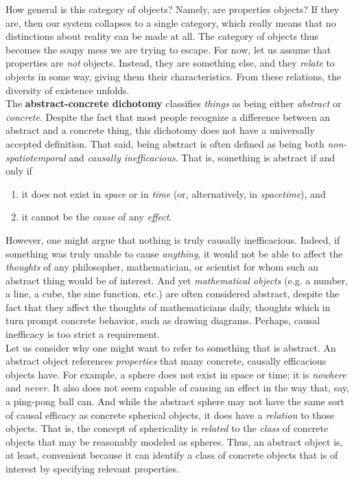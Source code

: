 How general is this category of objects? Namely, are properties objects? If they are, then our system collapses to a single category, which really means that no distinctions about reality can be made at all. The category of objects thus becomes the soupy mess we are trying to escape. For now, let us assume that properties are \textit{not} objects. Instead, they are something else, and they \textit{relate} to objects in some way, giving them their characteristics. From these relations, the diversity of existence unfolds. \\


The \textbf{abstract-concrete dichotomy} classifies \textit{things} as being either \textit{abstract} or \textit{concrete}. Despite the fact that most people recognize a difference between an abstract and a concrete thing, this dichotomy does not have a universally accepted definition. That said, being abstract is often defined as being both \textit{non-spatiotemporal} and \textit{causally inefficacious}. That is, something is abstract if and only if 

\begin{enumerate}
	\item it does not exist in \textit{space} or in \textit{time} (or, alternatively, in \textit{spacetime}), and
	\item it cannot be the \textit{cause} of any \textit{effect}. \\
\end{enumerate}

However, one might argue that nothing is truly causally inefficacious. Indeed, if something was truly unable to cause \textit{anything}, it would not be able to affect the \textit{thoughts} of any philosopher, mathematician, or scientist for whom such an abstract thing would be of interest. And yet \textit{mathematical objects} (e.g. a number, a line, a cube, the sine function, etc.) are often considered abstract, despite the fact that they affect the thoughts of mathematicians daily, thoughts which in turn prompt concrete behavior, such as drawing diagrams. Perhaps, causal inefficacy is too strict a requirement. \\

Let us consider why one might want to refer to something that is abstract. An abstract object references \textit{properties} that many concrete, causally efficacious objects have. For example, a sphere does not exist in space or time; it is \textit{nowhere} and \textit{never}. It also does not seem capable of causing an effect in the way that, say, a ping-pong ball can. And while the abstract sphere may not have the same sort of causal efficacy as concrete spherical objects, it does have a \textit{relation} to those objects. That is, the concept of sphericality is \textit{related} to the \textit{class} of concrete objects that may be reasonably modeled as spheres. Thus, an abstract object is, at least, convenient because it can identify a class of concrete objects that is of interest by specifying relevant properties. \\

